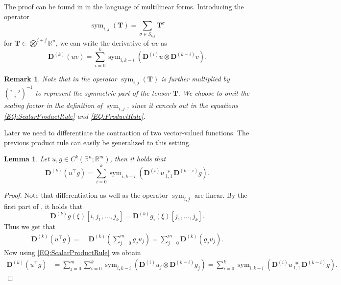 \documentclass[11pt,reqno]{amsart}
\numberwithin{equation}{section}
\theoremstyle{plain}
\newtheorem{lemma}{Lemma}
\newtheorem{remark}{Remark}
\newcommand{\R}{\mathbb{R}}
\DeclareMathOperator{\Sym}{sym}
\newcommand{\tenp}[2]{\underset{#1,#2}{*}}
\newcommand{\TenDeriv}[1]{\mathbf{D}^{(#1)}}
\begin{document}
The proof can be found in \cite{BreKP19} in the language of multilinear forms.
Introducing the operator
\[
  \Sym_{i,j}(\mathbf{T}) = \sum_{\sigma \in S_{i,j}} \mathbf{T}^{\sigma}
\]
for $\mathbf{T}\in \bigotimes^{i+j}\R^n$,
we can write the derivative of $uv$ as
\begin{equation}\label{EQ:ScalarProductRule}
  \TenDeriv{k}(uv) = \sum_{i=0}^{k} \Sym_{i,k-i} \left( \TenDeriv{i}u \otimes \TenDeriv{k-i}v \right).
\end{equation}
\begin{remark}
  Note that in \cite{BreKP19} the operator $\Sym_{i,j}(\mathbf{T})$ is further multiplied by $\binom{i+j}{i}^{-1}$ to represent the symmetric part of the tensor $\mathbf{T}$. We choose to omit the scaling factor in the definition of $\Sym_{i,j}$, since it cancels out in the equations \eqref{EQ:ScalarProductRule} and \eqref{EQ:ProductRule}.
\end{remark}

Later we need to differentiate the contraction of two vector-valued functions. The previous product rule can easily be generalized to this setting.
\begin{lemma}\label{LEM:ProductRule}
Let $u,g\in C^k(\R^n;\R^m)$, then it holds that
  \begin{equation}\label{EQ:ProductRule}
    \TenDeriv{k}(u^\top g) = \sum_{i=0}^{k} \Sym_{i,k-i}\left( \TenDeriv{i}u \tenp{1}{1} \TenDeriv{k-i}g \right).
  \end{equation}
\end{lemma}
\begin{proof}
  Note that differentiation as well as the operator $\Sym_{i,j}$ are linear. By the first part of , it holds that
  \[
    \TenDeriv{k}g(\xi)[i,j_1,\dots,j_k]=\TenDeriv{k}g_i(\xi)[j_1,\dots,j_k].
  \]
  Thus we get that
  \begin{align*}
    \TenDeriv{k}(u^\top g) =&\; \TenDeriv{k}\left(\sum_{j=0}^{m} g_ju_j \right) = \sum_{j=0}^{m} \TenDeriv{k}\left( g_ju_j \right).
  \end{align*}
  Now using \cref{EQ:ScalarProductRule} we obtain
  \begin{align*}
    \TenDeriv{k}(u^\top g) &= \sum_{j=0}^{m} \sum_{i=0}^{k} \Sym_{i,k-i} \left( \TenDeriv{i}u_j \otimes \TenDeriv{k-i}g_j \right)= \sum_{i=0}^{k} \Sym_{i,k-i}\left( \TenDeriv{i}u \tenp{1}{1} \TenDeriv{k-i}g \right). 
  \end{align*}
\end{proof}
%
\end{document}
